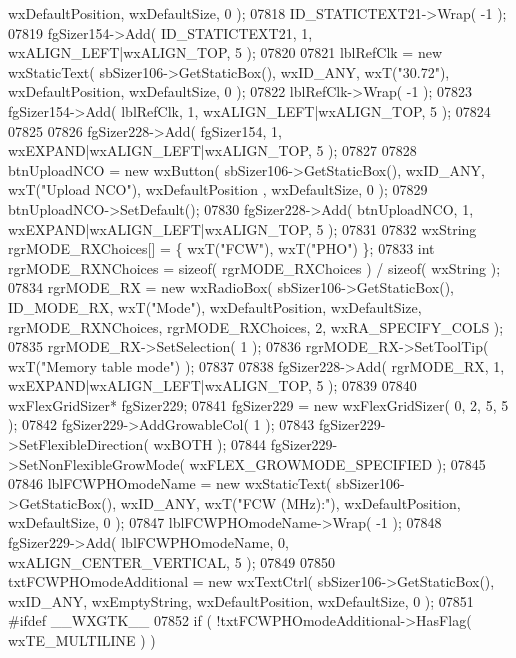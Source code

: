 \begin{DoxyCode}
      wxDefaultPosition, wxDefaultSize, 0 );
07818     ID_STATICTEXT21->Wrap( -1 );
07819     fgSizer154->Add( ID_STATICTEXT21, 1, wxALIGN\_LEFT|wxALIGN\_TOP, 5 );
07820     
07821     lblRefClk = \textcolor{keyword}{new} wxStaticText( sbSizer106->GetStaticBox(), wxID\_ANY, wxT(\textcolor{stringliteral}{"30.72"}), wxDefaultPosition, 
      wxDefaultSize, 0 );
07822     lblRefClk->Wrap( -1 );
07823     fgSizer154->Add( lblRefClk, 1, wxALIGN\_LEFT|wxALIGN\_TOP, 5 );
07824     
07825     
07826     fgSizer228->Add( fgSizer154, 1, wxEXPAND|wxALIGN\_LEFT|wxALIGN\_TOP, 5 );
07827     
07828     btnUploadNCO = \textcolor{keyword}{new} wxButton( sbSizer106->GetStaticBox(), wxID\_ANY, wxT(\textcolor{stringliteral}{"Upload NCO"}), wxDefaultPosition
      , wxDefaultSize, 0 );
07829     btnUploadNCO->SetDefault(); 
07830     fgSizer228->Add( btnUploadNCO, 1, wxEXPAND|wxALIGN\_LEFT|wxALIGN\_TOP, 5 );
07831     
07832     wxString rgrMODE\_RXChoices[] = \{ wxT(\textcolor{stringliteral}{"FCW"}), wxT(\textcolor{stringliteral}{"PHO"}) \};
07833     \textcolor{keywordtype}{int} rgrMODE\_RXNChoices = \textcolor{keyword}{sizeof}( rgrMODE\_RXChoices ) / \textcolor{keyword}{sizeof}( wxString );
07834     rgrMODE_RX = \textcolor{keyword}{new} wxRadioBox( sbSizer106->GetStaticBox(), ID_MODE_RX, wxT(\textcolor{stringliteral}{"Mode"}), wxDefaultPosition, 
      wxDefaultSize, rgrMODE\_RXNChoices, rgrMODE\_RXChoices, 2, wxRA\_SPECIFY\_COLS );
07835     rgrMODE_RX->SetSelection( 1 );
07836     rgrMODE_RX->SetToolTip( wxT(\textcolor{stringliteral}{"Memory table mode"}) );
07837     
07838     fgSizer228->Add( rgrMODE_RX, 1, wxEXPAND|wxALIGN\_LEFT|wxALIGN\_TOP, 5 );
07839     
07840     wxFlexGridSizer* fgSizer229;
07841     fgSizer229 = \textcolor{keyword}{new} wxFlexGridSizer( 0, 2, 5, 5 );
07842     fgSizer229->AddGrowableCol( 1 );
07843     fgSizer229->SetFlexibleDirection( wxBOTH );
07844     fgSizer229->SetNonFlexibleGrowMode( wxFLEX\_GROWMODE\_SPECIFIED );
07845     
07846     lblFCWPHOmodeName = \textcolor{keyword}{new} wxStaticText( sbSizer106->GetStaticBox(), wxID\_ANY, wxT(\textcolor{stringliteral}{"FCW (MHz):"}), 
      wxDefaultPosition, wxDefaultSize, 0 );
07847     lblFCWPHOmodeName->Wrap( -1 );
07848     fgSizer229->Add( lblFCWPHOmodeName, 0, wxALIGN\_CENTER\_VERTICAL, 5 );
07849     
07850     txtFCWPHOmodeAdditional = \textcolor{keyword}{new} wxTextCtrl( sbSizer106->GetStaticBox(), wxID\_ANY, wxEmptyString, 
      wxDefaultPosition, wxDefaultSize, 0 );
07851 \textcolor{preprocessor}{    #ifdef \_\_WXGTK\_\_}
07852     \textcolor{keywordflow}{if} ( !txtFCWPHOmodeAdditional->HasFlag( wxTE\_MULTILINE ) )

\end{DoxyCode}
